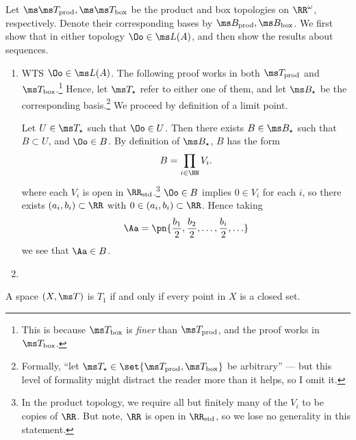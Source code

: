 \documentclass{fkpset}
\newcommand{\tprod}{\ensuremath \ms T_{\rm prod}}
\newcommand{\bprod}{\ensuremath \ms B_{\rm prod}}
\newcommand{\tbox}{\ensuremath \ms T_{\rm box}}
\newcommand{\bbox}{\ensuremath \ms B_{\rm box}}
\newcommand{\tstar}{\ensuremath \ms T_{\star}}
\newcommand{\bstar}{\ensuremath \ms B_{\star}}
\begin{document}
  \begin{solution}
    Let $\ms \tprod, \ms \tbox$ be the product and box topologies on
    $\RR^\omega$, respectively. Denote their corresponding bases by
    $\bprod, \bbox$. We first show that in either topology $\Oo \in
    \ms L(A)$, and then show the results about sequences.
    \begin{enumerate}[label=(\arabic*)]
      \item WTS $\Oo \in \ms L(A)$. The following proof works in both
        $\tprod$ and $\tbox$.\footnote{This is because $\tbox$ is
          \emph{finer} than $\tprod$, and the proof works in $\tbox$.}
        Hence, let $\tstar$ refer to either one of them, and let
        $\bstar$ be the corresponding basis.\footnote{Formally, ``let
          $\tstar \in \set{\tprod, \tbox}$ be arbitrary'' --- but this
          level of formality might distract the reader more than it
          helps, so I omit it.} We proceed by definition of a limit
        point.

        Let $U \in \tstar$ such that $\Oo \in U$. Then there exists $B
        \in \bstar$ such that $B \subset U$, and $\Oo \in B$. By
        definition of $\ms B_\star$, $B$ has the form
        \[
          B = \prod_{i \in \NN} V_i.
        \]
        where each $V_i$ is open in $\RR_{\rm std}$.\footnote{In the
          product topology, we require all but finitely many of the
          $V_i$ to be copies of $\RR$. But note, $\RR$ is open in
          $\RR_{\rm std}$, so we lose no generality in this
          statement.}
        $\Oo \in B$ implies $0 \in V_i$ for each $i$, so there exists
        $(a_i, b_i) \subset \RR$ with $0 \in (a_i,b_i) \subset \RR$.
        Hence taking
        \[
          \Aa = \pn{\frac{b_1}{2}, \frac{b_2}{2}, \ldots,
            \frac{b_i}{2}, \ldots}
        \]
        we see that $\Aa \in B$.
      \item
    \end{enumerate}
  \end{solution}
  \clearpage

  \begin{problem}[5.1]
    A space $(X, \ms T)$ is $T_1$ if and only if every point in $X$ is
    a closed set.
  \end{problem}
  \begin{solution}

  \end{solution}
  \clearpage
\end{document}
